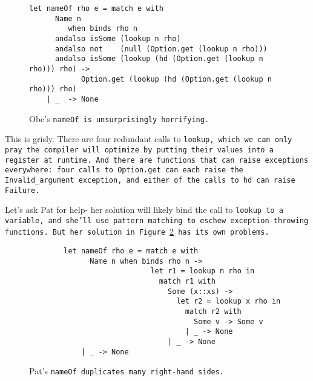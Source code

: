 \documentclass[manuscript,screen,review, 12pt]{acmart}
\begin{document}
    \begin{figure}[ht]
        \begin{verbatim}
let nameOf rho e = match e with     
      Name n   
         when binds rho n 
      andalso isSome (lookup n rho) 
      andalso not    (null (Option.get (lookup n rho))) 
      andalso isSome (lookup (hd (Option.get (lookup n rho))) rho) ->
            Option.get (lookup (hd (Option.get (lookup n rho))) rho)
    | _  -> None
            \end{verbatim}
        \caption{Obe's \tt{nameOf} is unsurprisingly horrifying.}
        \label{fig:obenameof}
    \end{figure}

    This is grisly. There are four redundant calls to \tt{lookup}, which we can
    only pray the compiler will optimize by putting their values into a register
    at runtime. And there are functions that can raise exceptions everywhere:
    four calls to \tt{Option.get} can each raise the \tt{Invalid\_argument}
    exception, and either of the calls to \tt{hd} can raise \tt{Failure}. 

    Let's ask Pat for help- her solution will likely bind the call to
    \tt{lookup} to a variable, and she'll use pattern matching to eschew
    exception-throwing functions. But her solution in Figure~\ref{fig:patnameof} has
    its own problems. 

    \begin{figure}[ht]
        \begin{verbatim}
        let nameOf rho e = match e with     
              Name n when binds rho n -> 
                            let r1 = lookup n rho in 
                              match r1 with 
                                Some (x::xs) -> 
                                  let r2 = lookup x rho in 
                                    match r2 with 
                                      Some v -> Some v   
                                    | _ -> None
                                | _ -> None
            | _ -> None 
            \end{verbatim}
        \caption{Pat's \tt{nameOf} duplicates many right-hand sides.}
        \label{fig:patnameof}
    \end{figure}
\end{document}
